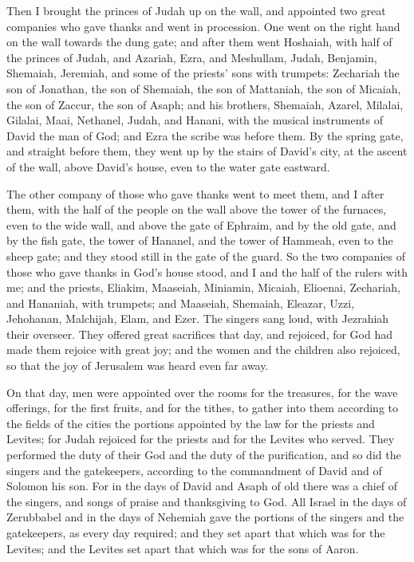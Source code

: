  Then I brought the princes of Judah up on the wall, and
appointed two great companies who gave thanks and went in procession.
One went on the right hand on the wall towards the dung gate;
 and after them went Hoshaiah, with half of the princes of
Judah,  and Azariah, Ezra, and Meshullam, 
Judah, Benjamin, Shemaiah, Jeremiah,  and some of the
priests' sons with trumpets: Zechariah the son of Jonathan, the son of
Shemaiah, the son of Mattaniah, the son of Micaiah, the son of Zaccur,
the son of Asaph;  and his brothers, Shemaiah, Azarel,
Milalai, Gilalai, Maai, Nethanel, Judah, and Hanani, with the musical
instruments of David the man of God; and Ezra the scribe was before
them.  By the spring gate, and straight before them, they
went up by the stairs of David's city, at the ascent of the wall, above
David's house, even to the water gate eastward.

 The other company of those who gave thanks went to meet
them, and I after them, with the half of the people on the wall above
the tower of the furnaces, even to the wide wall,  and
above the gate of Ephraim, and by the old gate, and by the fish gate,
the tower of Hananel, and the tower of Hammeah, even to the sheep gate;
and they stood still in the gate of the guard.  So the two
companies of those who gave thanks in God's house stood, and I and the
half of the rulers with me;  and the priests, Eliakim,
Maaseiah, Miniamin, Micaiah, Elioenai, Zechariah, and Hananiah, with
trumpets;  and Maaseiah, Shemaiah, Eleazar, Uzzi,
Jehohanan, Malchijah, Elam, and Ezer. The singers sang loud, with
Jezrahiah their overseer.  They offered great sacrifices
that day, and rejoiced, for God had made them rejoice with great joy;
and the women and the children also rejoiced, so that the joy of
Jerusalem was heard even far away.

 On that day, men were appointed over the rooms for the
treasures, for the wave offerings, for the first fruits, and for the
tithes, to gather into them according to the fields of the cities the
portions appointed by the law for the priests and Levites; for Judah
rejoiced for the priests and for the Levites who served. 
They performed the duty of their God and the duty of the purification,
and so did the singers and the gatekeepers, according to the commandment
of David and of Solomon his son.  For in the days of David
and Asaph of old there was a chief of the singers, and songs of praise
and thanksgiving to God.  All Israel in the days of
Zerubbabel and in the days of Nehemiah gave the portions of the singers
and the gatekeepers, as every day required; and they set apart that
which was for the Levites; and the Levites set apart that which was for
the sons of Aaron.

